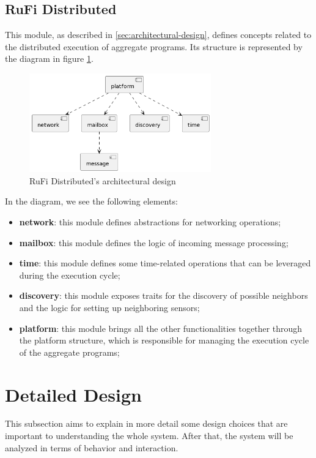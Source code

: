 \subsection{RuFi Distributed}
\label{subsec:rufi-distributed}
This module, as described in \ref{sec:architectural-design}, defines concepts related to the distributed execution of aggregate programs.
Its structure is represented by the diagram in figure \ref{fig:rufi-distributed-architecture}.

\begin{figure}[ht!]
    \centering
    \includegraphics[width=0.7\textwidth]{figures/diagrams/img/rufi-distributed-architecture.png}
    \caption{RuFi Distributed's architectural design}
    \label{fig:rufi-distributed-architecture}
\end{figure}

In the diagram, we see the following elements:

\begin{itemize}
    \item \textbf{network}: this module defines abstractions for networking operations;
    \item \textbf{mailbox}: this module defines the logic of incoming message processing;
    \item \textbf{time}: this module defines some time-related operations that can be leveraged during the execution cycle;
    \item \textbf{discovery}: this module exposes traits for the discovery of possible neighbors and the logic for setting up neighboring sensors;
    \item \textbf{platform}: this module brings all the other functionalities together through the platform structure, which is responsible for managing the execution cycle of the aggregate programs;
\end{itemize}

\section{Detailed Design}
\label{sec:detailed-design}
This subsection aims to explain in more detail some design choices that are important to understanding the whole system.
After that, the system will be analyzed in terms of behavior and interaction.


